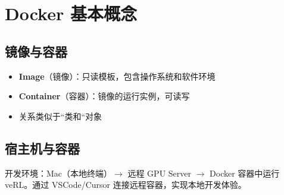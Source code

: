\section{Docker 基本概念}
\subsection{镜像与容器}
\begin{itemize}
  \item \textbf{Image}（镜像）：只读模板，包含操作系统和软件环境
  \item \textbf{Container}（容器）：镜像的运行实例，可读写
  \item 关系类似于``类和``对象
\end{itemize}

\subsection{宿主机与容器}
开发环境：Mac（本地终端）$\to$ 远程 GPU Server $\to$ Docker 容器中运行 veRL。通过 VSCode/Cursor 连接远程容器，实现本地开发体验。

